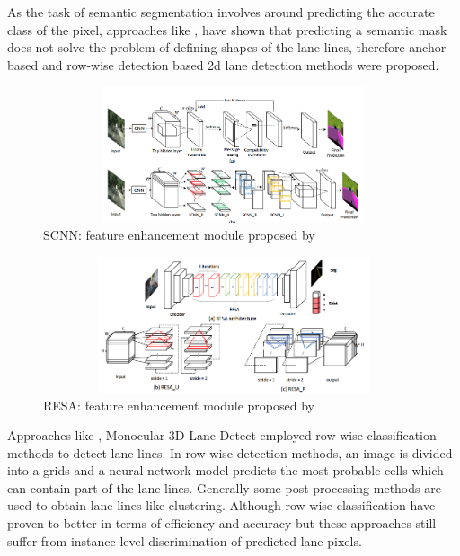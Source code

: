         As the task of semantic segmentation involves around predicting the accurate class of the pixel, approaches like \cite{https://doi.org/10.48550/arxiv.2010.12035}, \cite{inbook} have shown that predicting a semantic mask does not solve the problem of defining shapes of the lane lines, therefore anchor based and row-wise detection based 2d lane detection methods were proposed.
        
         \begin{figure}[h]
    \centering
\includegraphics[width=12cm, height=4cm]{images/scnn_module.png}
    \caption{SCNN: feature enhancement module proposed by  \cite{DBLP:journals/corr/abs-1712-06080}}
    \end{figure}
    
     \begin{figure}[h]
    \centering
\includegraphics[width=12cm, height=4cm]{images/resa_module.png}
    \caption{RESA: feature enhancement module proposed by \cite{DBLP:journals/corr/abs-2008-13719}}
    \end{figure}

 Approaches like \cite{DBLP:journals/corr/abs-2005-08630}, \cite{DBLP:journals/corr/abs-2004-11757}Monocular 3D Lane Detect employed row-wise classification methods to detect lane lines. In row wise detection methods, an image is divided into a grids and a neural network model predicts the most probable cells which can contain part of the lane lines. Generally some post processing methods are used to obtain lane lines like clustering. Although row wise classification have proven to better in terms of efficiency and accuracy but these approaches still suffer from instance level discrimination of predicted lane pixels.
 
